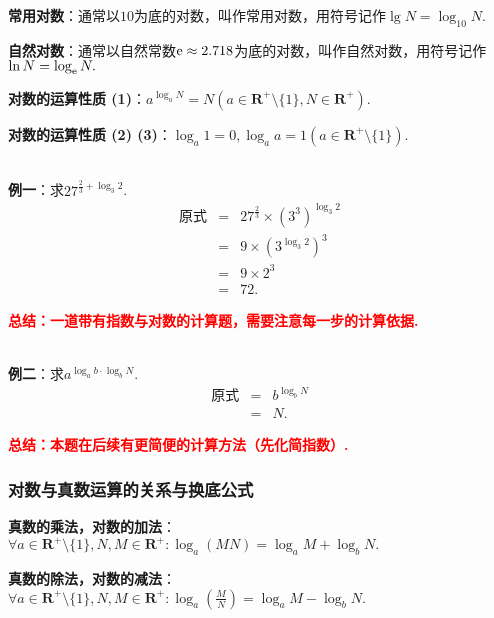 \documentclass[8pt]{article}
\begin{document}
				\textbf{常用对数}：通常以$10$为底的对数，叫作常用对数，用符号记作$\lg{N}=\log_{10}{N}.$

				\textbf{自然对数}：通常以自然常数$\rm{e} \approx 2.718$为底的对数，叫作自然对数，用符号记作$\ln{N}=\log_{\rm{e}}{N}.$

				\textbf{对数的运算性质 (1)}：$\displaystyle a^{\log_{a}{N}}=N (a\in \mathbf{R}^{+} \setminus \{1\}, N\in \mathbf{R}^{+}).$

				\textbf{对数的运算性质 (2) (3)}：$\displaystyle \log_a{1}=0, \log_a{a}=1 (a\in \mathbf{R}^{+} \setminus \{1\}).$

				~\\

				\textbf{例一}：求$\displaystyle 27^{\frac{2}{3}+\log_{3}{2}}$.
					~\\

					$$
					\begin{array}{rcl}
					\text{原式}&=&\displaystyle 27^\frac{2}{3} \times {\left(3^3\right)}^{\log_{3}{2}}\\
					&=&9\times {\left(3^{\log_{3}{2}}\right)}^{3}\\
					&=&9\times 2^3\\
					&=&72.
					\end{array}
					$$

					\textcolor{red}{\textbf{总结：一道带有指数与对数的计算题，需要注意每一步的计算依据.}}

				~\\

				\textbf{例二}：求$\displaystyle a^{\log_{a}{b}\cdot\log_{b}{N}}$.
					~\\

					$$
					\begin{array}{rcl}
					\text{原式}&=&\displaystyle b^{\log_{b}{N}}\\
					&=&N.
					\end{array}
					$$

					\textcolor{red}{\textbf{总结：本题在后续有更简便的计算方法（先化简指数）.}}

			\subsubsection{对数与真数运算的关系与换底公式}
				\textbf{真数的乘法，对数的加法}：$\forall a\in \mathbf{R}^{+} \setminus \{1\}, N, M\in \mathbf{R}^{+}: \log_{a}{(MN)}=\log_{a}{M}+\log_{b}{N}.$

				\textbf{真数的除法，对数的减法}：$\forall a\in \mathbf{R}^{+} \setminus \{1\}, N, M\in \mathbf{R}^{+}: \displaystyle\log_{a}{\left(\frac{M}{N}\right)}=\log_{a}{M}-\log_{b}{N}.$
\end{document}

